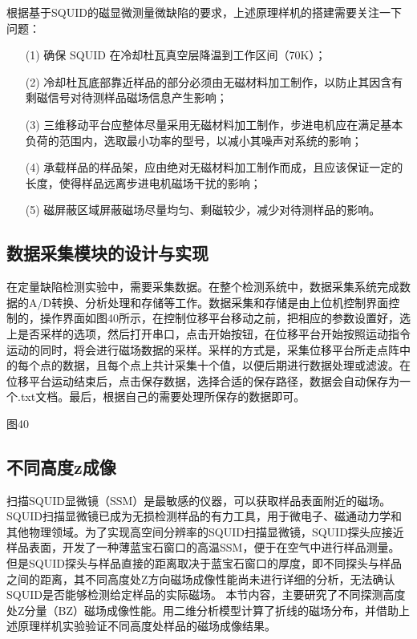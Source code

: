 \documentclass[a4paper,12pt，twoside]{ctexart}
\begin{document}
	根据基于SQUID的磁显微测量微缺陷的要求，上述原理样机的搭建需要关注一下问题：\par 
	\begin{enumerate}
		\item [(1)]确保 SQUID 在冷却杜瓦真空层降温到工作区间（70K）；
		\item [(2)]冷却杜瓦底部靠近样品的部分必须由无磁材料加工制作，以防止其因含有剩磁信号对待测样品磁场信息产生影响；
		\item [(3)]三维移动平台应整体尽量采用无磁材料加工制作，步进电机应在满足基本负荷的范围内，选取最小功率的型号，以减小其噪声对系统的影响；
		\item [(4)]承载样品的样品架，应由绝对无磁材料加工制作而成，且应该保证一定的长度，使得样品远离步进电机磁场干扰的影响；
		\item [(5)]磁屏蔽区域屏蔽磁场尽量均匀、剩磁较少，减少对待测样品的影响。
	\end{enumerate}
	
	
	\subsection{数据采集模块的设计与实现}
	在定量缺陷检测实验中，需要采集数据。在整个检测系统中，数据采集系统完成数据的A/D转换、分析处理和存储等工作。数据采集和存储是由上位机控制界面控制的，操作界面如图40所示，在控制位移平台移动之前，把相应的参数设置好，选上是否采样的选项，然后打开串口，点击开始按钮，在位移平台开始按照运动指令运动的同时，将会进行磁场数据的采样。采样的方式是，采集位移平台所走点阵中的每个点的数据，且每个点上共计采集十个值，以便后期进行数据处理或滤波。在位移平台运动结束后，点击保存数据，选择合适的保存路径，数据会自动保存为一个.txt文档。最后，根据自己的需要处理所保存的数据即可。\par 
	图40\par 
	
	
	\subsection{不同高度z成像}
	扫描SQUID显微镜（SSM）是最敏感的仪器，可以获取样品表面附近的磁场。SQUID扫描显微镜已成为无损检测样品的有力工具，用于微电子、磁通动力学和其他物理领域。为了实现高空间分辨率的SQUID扫描显微镜，SQUID探头应接近样品表面，开发了一种薄蓝宝石窗口的高温SSM，便于在空气中进行样品测量。但是SQUID探头与样品直接的距离取决于蓝宝石窗口的厚度，即不同探头与样品之间的距离，其不同高度处Z方向磁场成像性能尚未进行详细的分析，无法确认SQUID是否能够检测给定样品的实际磁场。
	本节内容，主要研究了不同探测高度处Z分量（BZ）磁场成像性能。用二维分析模型计算了折线的磁场分布，并借助上述原理样机实验验证不同高度处样品的磁场成像结果。
	\newpage
\end{document}
